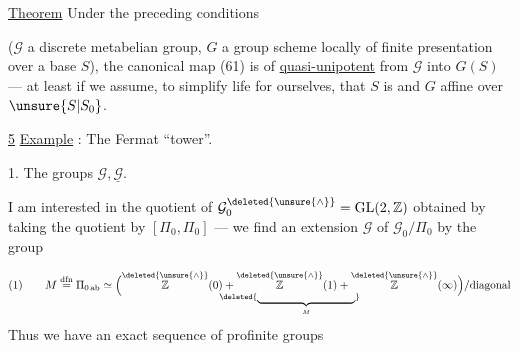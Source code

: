 \uline{Theorem}  Under the preceding conditions

($\mathcal{G}$ a discrete metabelian group, $G$ a group scheme locally of finite presentation over a base  $S$), the canonical map (61) is    of  \uline{quasi-unipotent} from $\mathcal{G}$ into $G(S)$ --- at least if we assume, to simplify life for ourselves, that $S$ is  and $G$ affine over $\unsure{S|S_0}$.



\uline{5} \uline{Example} : The Fermat ``tower''.

1. The groups $\mathcal{G},\underline{\mathcal{G}}$.

I am interested in the quotient of $\mathcal{G}_0^{\deleted{\unsure{\wedge}}}=\operatorname{GL}(2,\mathbb{Z})$ obtained by taking the quotient by $[\Pi_0,\Pi_0]$ --- we find an extension $\mathcal{G}$ of $\mathcal{G}_0/\Pi_0$ by the group


\[
\begin{aligned}
(1)\qquad M\overset{\mathrm{dfn}}{=}\Pi_{0\,\mathrm{ab}}
\simeq
\Bigl(
\underset{\deleted{\underbrace{\hphantom{\mathbb{Z}(0)+\mathbb{Z}(1)+\mathbb{Z}(\infty)}}_{M}}}
{\overset{\deleted{\unsure{\wedge}}}{\mathbb{Z}}(0)+
 \overset{\deleted{\unsure{\wedge}}}{\mathbb{Z}}(1)+
 \overset{\deleted{\unsure{\wedge}}}{\mathbb{Z}}(\infty)}
\Bigr)/\text{diagonal}
\end{aligned}
\]
Thus we have an exact sequence of profinite groups

